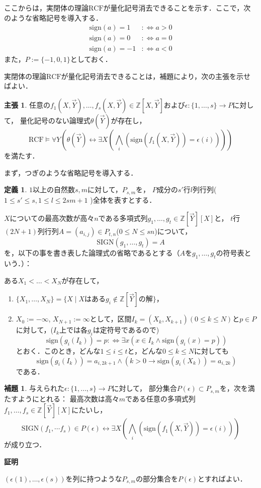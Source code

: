 \documentclass[uplatex, dvipdfmx]{jsarticle}
\makeatletter
\renewenvironment{proof}[1][\proofname]{\par
  \pushQED{\qed}%
  \normalfont \topsep6\p@\@plus6\p@\relax
  \trivlist
  \item\relax
  {\bfseries
  #1\@addpunct{.}}\hspace\labelsep\ignorespaces
}{%
  \popQED\endtrivlist\@endpefalse
}
\newcommand{\sign}{\mathrm{sign}}
\newcommand{\SIGN}{\mathrm{SIGN}}
\newcommand{\defiff}{:\Leftrightarrow}
\newcommand{\RCF}{\mathrm{RCF}}
\newcommand{\Z}{\mathbb{Z}}
\newcommand{\map}[3]{{#1}:{#2}\rightarrow{#3}}
\theoremstyle{definition}
\newtheorem{definition}{定義}[section]
\newtheorem{lemma}{補題}[section]
\newtheorem*{claim*}{主張}
\renewcommand{\proofname}{\textbf{証明}}
\makeatother
\begin{document}
ここからは，実閉体の理論$\RCF$が量化記号消去できることを示す．ここで，次のような省略記号を導入する．
\begin{align*}
    \sign(a) = 1 &\defiff a>0\\
    \sign(a) = 0 &\defiff a=0\\
    \sign(a) = -1 &\defiff a<0
\end{align*}
また，$P:=\{-1,0,1\}$としておく．

実閉体の理論$\RCF$が量化記号消去できることは，補題により，次の主張を示せばよい．
\begin{claim*}
    任意の$f_1(X,\vec{Y}), \dots, f_s(X,\vec{Y}) \in \Z[X,\vec{Y}]$および$\map{\epsilon}{\{1,\dots,s\}}{P}$に対して，
    量化記号のない論理式$\theta(\vec{Y})$が存在し，
    \[
        \RCF \models \forall Y (\theta(\vec{Y}) \leftrightarrow \exists X (\bigwedge_i(\sign(f_1(X,\vec{Y}))=\epsilon(i))))
    \]
    を満たす．
\end{claim*}

まず，つぎのような省略記号を導入する．
\begin{definition}
    $1$以上の自然数$s,m$に対して，$P_{s,m}$を，
    $P$成分の$s'$行$l$列行列( $1 \leq s' \leq s, 1 \leq l \leq 2sm+1$ )全体を表すとする．

    $X$についての最高次数が高々$n$である多項式列$g_1,\dots,g_t \in \Z[\vec{Y}][X]$と，
    $t$行$(2N+1)$列行列$A=(a_{i,j}) \in P_{t,n}$($0 \leq N \leq sn$)について，
    \[
        \SIGN(g_1, \dots, g_t) = A
    \]
    を，以下の事を書き表した論理式の省略であるとする（$A$を$g_1,\dots,g_t$の符号表という．）：

    ある$X_1<\dots<X_N$が存在して，
    \begin{enumerate}
        \item $\{X_1, \dots, X_N\} = \{X \mid \text{$X$はある$g_i \notin \Z[\vec{Y}]の解$}\}$，
        \item $X_0 := -\infty$, $X_{N+1} := \infty$として，区間$I_k = (X_k, X_{k+1}) (0 \leq k \leq N)$と$p \in P$に対して，($I_k$上では各$g_i$は定符号であるので)
        \[
            \sign(g_i(I_k))=p \defiff \exists x (x \in I_k \land \sign(g_i(x) = p))
        \]
        とおく．このとき，どんな$1 \leq i \leq t$と，どんな$0 \leq k \leq N$に対しても
        \[
            \sign(g_i(I_k))=a_{i,2k+1} \land (k>0 \rightarrow \sign(g_i(X_k))=a_{i,2k})
        \]
        である．
    \end{enumerate}
\end{definition}

\begin{lemma}\label{simplify}
    与えられた$\map{\epsilon}{\{1,\dots,s\}}{P}$に対して，
    部分集合$P(\epsilon) \subset P_{s,m}$を，次を満たすようにとれる：
    最高次数は高々$m$である任意の多項式列$f_1, \dots, f_s \in \Z[\vec{Y}][X]$にたいし，
    \[
    \SIGN(f_1, \dotsm f_s) \in P(\epsilon) 
    \leftrightarrow \exists X (\bigwedge_i(\sign(f_1(X,\vec{Y}))=\epsilon(i)))
    \]
    が成り立つ．
\end{lemma}
\begin{proof}
    $(\epsilon(1),\dots,\epsilon(s))$を列に持つような$P_{s,m}$の部分集合を$P(\epsilon)$とすればよい．
\end{proof}
\end{document}
